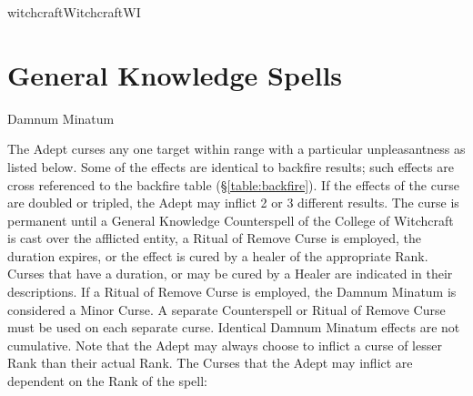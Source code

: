 \begin{College}[1.1]{witchcraft}{Witchcraft}{WI}
\section{General Knowledge Spells}

\begin{spell}[G-1]{Damnum Minatum}

\begin{effects}
The Adept curses any one target within range with a particular
unpleasantness as listed below. Some of the effects are identical to
backfire results; such effects are cross referenced to the backfire
table (\S\ref{table:backfire}).  If the effects of the curse are
doubled or tripled, the Adept may inflict 2 or 3 different results.
The curse is permanent until a General Knowledge Counterspell of the
College of Witchcraft is cast over the afflicted entity, a Ritual of
Remove Curse is employed, the duration expires, or the effect is cured
by a healer of the appropriate Rank. Curses that have a duration, or
may be cured by a Healer are indicated in their descriptions. If a
Ritual of Remove Curse is employed, the Damnum Minatum is considered a
Minor Curse.  A separate Counterspell or Ritual of Remove Curse must
be used on each separate curse.  Identical Damnum Minatum effects are
not cumulative.  Note that the Adept may always choose to inflict a
curse of lesser Rank than their actual Rank.  The Curses that the
Adept may inflict are dependent on the Rank of the spell:


\end{effects}
\end{spell}
\end{College}
